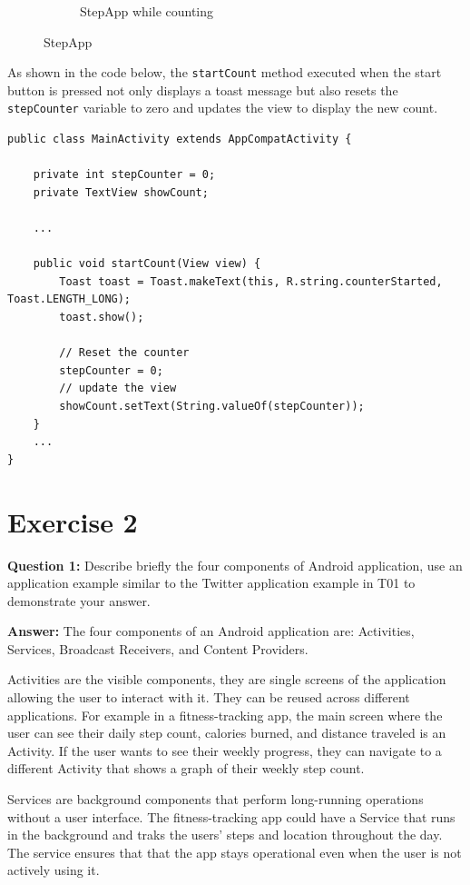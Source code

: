 \documentclass{usireport}
\begin{document}
\begin{figure}[H]
\begin{subfigure}{0.4\textwidth}
        \caption{StepApp while counting}
        \label{fig:stepapp_count}
    \end{subfigure}
    \caption{StepApp}
    \label{fig:stepapp}
\end{figure}


As shown in the code below, the \texttt{startCount} method executed when the start button is pressed not only displays a toast message but also resets the \texttt{stepCounter} variable to zero and updates the view to display the new count.

\begin{verbatim} 
public class MainActivity extends AppCompatActivity {

    private int stepCounter = 0;
    private TextView showCount;

    ...

    public void startCount(View view) {
        Toast toast = Toast.makeText(this, R.string.counterStarted, Toast.LENGTH_LONG);
        toast.show();

        // Reset the counter
        stepCounter = 0;
        // update the view
        showCount.setText(String.valueOf(stepCounter));
    }
    ...
}
\end{verbatim}


\section{Exercise 2}

\textbf{Question 1:} Describe briefly the four components of Android application, use an application example similar to the Twitter application example in T01 to demonstrate your answer.

\textbf{Answer:} The four components of an Android application are: Activities, Services, Broadcast Receivers, and Content Providers. 

Activities are the visible components, they are single screens of the application allowing the user to interact with it. They can be reused across different applications. For example in a fitness-tracking app, the main screen where the user can see their daily step count, calories burned, and distance traveled is an Activity. If the user wants to see their weekly progress, they can navigate to a different Activity that shows a graph of their weekly step count.

Services are background components that perform long-running operations without a user interface. The fitness-tracking app could have a Service that runs in the background and traks the users' steps and location throughout the day. The service ensures that that the app stays operational even when the user is not actively using it.
\end{document}

